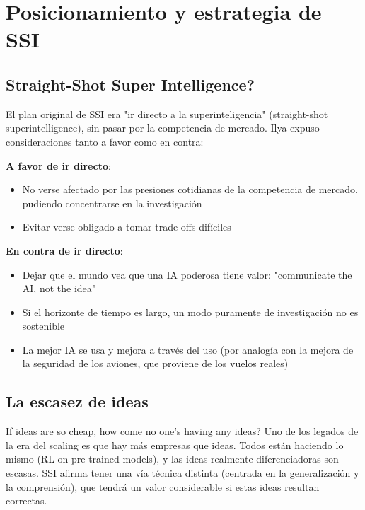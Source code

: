 \section{Posicionamiento y estrategia de SSI}

\subsection{Straight-Shot Super Intelligence?}

El plan original de SSI era "ir directo a la superinteligencia" (straight-shot superintelligence), sin pasar por la competencia de mercado. Ilya expuso consideraciones tanto a favor como en contra:

\textbf{A favor de ir directo}:
\begin{itemize}
    \item No verse afectado por las presiones cotidianas de la competencia de mercado, pudiendo concentrarse en la investigación
    \item Evitar verse obligado a tomar trade-offs difíciles
\end{itemize}

\textbf{En contra de ir directo}:
\begin{itemize}
    \item Dejar que el mundo vea que una IA poderosa tiene valor: "communicate the AI, not the idea"
    \item Si el horizonte de tiempo es largo, un modo puramente de investigación no es sostenible
    \item La mejor IA se usa y mejora a través del uso (por analogía con la mejora de la seguridad de los aviones, que proviene de los vuelos reales)
\end{itemize}

\subsection{La escasez de ideas}

\begin{importantbox}{If ideas are so cheap, how come no one's having any ideas?}
Uno de los legados de la era del scaling es que hay más empresas que ideas. Todos están haciendo lo mismo (RL on pre-trained models), y las ideas realmente diferenciadoras son escasas. SSI afirma tener una vía técnica distinta (centrada en la generalización y la comprensión), que tendrá un valor considerable si estas ideas resultan correctas.
\end{importantbox}

